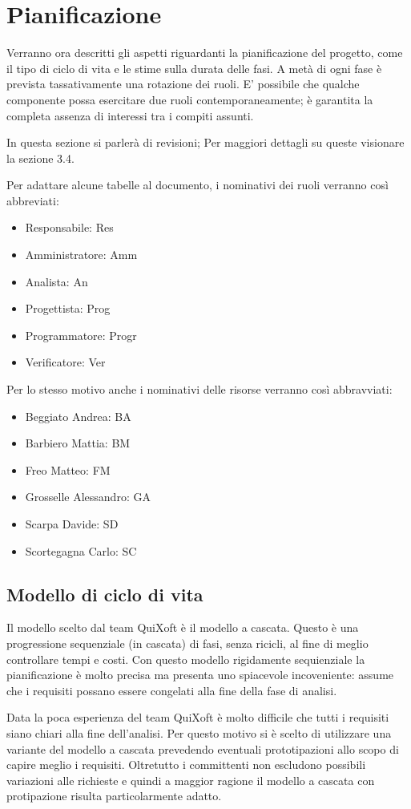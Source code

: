 \documentclass[11pt,a4paper]{article}
\begin{document}
\section{Pianificazione}
Verranno ora descritti gli aspetti riguardanti la pianificazione del progetto, come il tipo di ciclo di vita e le stime sulla durata delle fasi.
A metà di ogni fase è prevista tassativamente una rotazione dei ruoli.
E' possibile che qualche componente possa esercitare due ruoli contemporaneamente; è garantita la completa assenza di interessi tra i compiti assunti.

In questa sezione si parlerà di revisioni; Per maggiori dettagli su queste visionare la sezione 3.4.

Per adattare alcune tabelle al documento, i nominativi dei ruoli verranno così abbreviati:
\begin{itemize}
\item Responsabile: Res
\item Amministratore: Amm
\item Analista: An
\item Progettista: Prog
\item Programmatore: Progr
\item Verificatore: Ver
\end{itemize}
Per lo stesso motivo anche i nominativi delle risorse verranno così abbravviati:
\begin{itemize}
\item Beggiato Andrea: BA
\item Barbiero Mattia: BM
\item Freo Matteo: FM
\item Grosselle Alessandro: GA
\item Scarpa Davide: SD
\item Scortegagna Carlo: SC
\end{itemize}
\subsection{Modello di ciclo di vita}
Il modello scelto dal team QuiXoft è il modello a cascata.
Questo è una progressione sequenziale (in cascata) di fasi, senza ricicli, al fine di meglio controllare tempi e costi.
Con questo modello rigidamente sequienziale la pianificazione è molto precisa ma presenta uno spiacevole incoveniente: assume che i requisiti possano essere congelati alla fine della fase di analisi.

Data la poca esperienza del team QuiXoft è molto difficile che tutti i requisiti siano chiari alla fine dell'analisi.
Per questo motivo si è scelto di utilizzare una variante del modello a cascata prevedendo eventuali prototipazioni allo scopo di capire meglio i requisiti.
Oltretutto i committenti non escludono possibili variazioni alle richieste e quindi a maggior ragione il modello a cascata con protipazione risulta particolarmente adatto.
\end{document}
